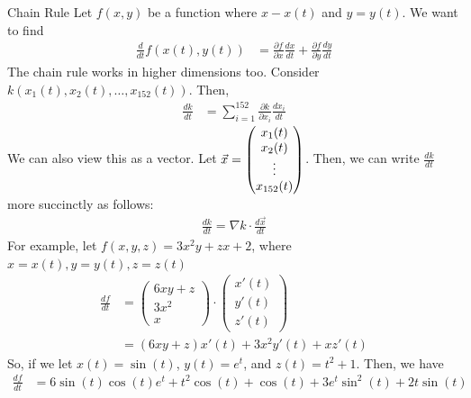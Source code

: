 \documentclass[8pt]{extarticle}
\begin{document}
  \begin{problem}{Chain Rule}
    Let $f(x,y)$ be a function where $x - x(t)$ and $y = y(t)$. We want to find
    \begin{align*}
      \frac{d}{dt}f(x(t),y(t)) &= \frac{\partial f}{\partial x}\frac{dx}{dt} + \frac{\partial f}{\partial y}\frac{dy}{dt}
    \end{align*}
    The chain rule works in higher dimensions too. Consider $k(x_1(t),x_2(t),\dots,x_{152}(t))$. Then,
    \begin{align*}
      \frac{dk}{dt} &= \sum_{i=1}^{152}\frac{\partial k}{\partial x_i}\frac{dx_i}{dt}
    \end{align*}
    We can also view this as a vector. Let $\vec x = \begin{pmatrix}x_{\small 1}(t)\\x_{\small 2}(t)\\\vdots\\x_{\small152}(t)\end{pmatrix}$. Then, we can write $\frac{dk}{dt}$ more succinctly as follows:
    \begin{align*}
      \frac{dk}{dt} = \nabla k \cdot \frac{d\vec x}{dt}
    \end{align*}
    For example, let $f(x,y,z) = 3x^2y + zx + 2$, where $x = x(t),y=y(t),z=z(t)$
    \begin{align*}
      \frac{df}{dt} &= \begin{pmatrix}6xy+z\\3x^2\\x\end{pmatrix} \cdot \begin{pmatrix}x'(t)\\y'(t)\\z'(t)\end{pmatrix}\\
                    &= \left(6xy + z\right)x'(t) + 3x^2y'(t) + xz'(t)
    \end{align*}
    So, if we let $x(t) = \sin(t)$, $y(t) = e^t$, and $z(t) = t^2 + 1$. Then, we have
    \begin{align*}
      \frac{df}{dt} &= 6\sin(t)\cos(t)e^t + t^2\cos(t) + \cos(t) + 3e^t\sin^2(t) + 2t\sin(t)
    \end{align*}


\end{problem}
\end{document}
